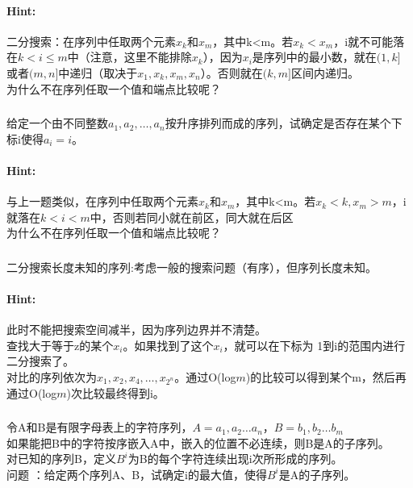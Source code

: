 \documentclass{article}
\begin{document}
     \paragraph{Hint:}二分搜索：在序列中任取两个元素$x_{k}$和$x_{m}$，其中k<m。若$x_{k}<x_{m}$，i就不可能落在$k<i\leq m$中（注意，这里不能排除$x_{k}$），因为$x_{i}$是序列中的最小数，就在$(1,k]$ 或者$(m,n]$中递归（取决于$x_{1},x_{k},x_{m},x_{n}$）。否则就在$(k ,m]$区间内递归。\\
     为什么不在序列任取一个值和端点比较呢？
     
     \subsubsection{}给定一个由不同整数$a_{1},a_{2},…,a_{n}$按升序排列而成的序列，试确定是否存在某个下标i使得$a_{i}=i$。

     \paragraph{Hint:}与上一题类似，在序列中任取两个元素$x_{k}$和$x_{m}$，其中k<m。若$x_{k}<k,x_{m}>m$，i就落在$k<i<m$中，否则若同小就在前区，同大就在后区\\
     为什么不在序列任取一个值和端点比较呢？
     
     \subsubsection{}二分搜索长度未知的序列:考虑一般的搜索问题（有序），但序列长度未知。
     \paragraph{Hint:}此时不能把搜索空间减半，因为序列边界并不清楚。\\
查找大于等于z的某个$x_i$。如果找到了这个$x_i$，就可以在下标为
1到i的范围内进行二分搜索了。\\
     对比的序列依次为$x_1,x_2,x_4,\dots,x_{2^{n}}$。通过O(log$m$)的比较可以得到某个m，然后再通过O(log$m$)次比较最终得到i。
     
     \subsubsection{}令A和B是有限字母表上的字符序列，$A=a_{1},a_{2}…a_{n}，B=b_{1},b_{2}…b_{m}$\\
     如果能把B中的字符按序嵌入A中，嵌入的位置不必连续，则B是A的子序列。\\
     对已知的序列B，定义$B^{i}$为B的每个字符连续出现i次所形成的序列。\\
     问题 ：给定两个序列A、B，试确定i的最大值，使得$B^i$是A的子序列。
\end{document}
